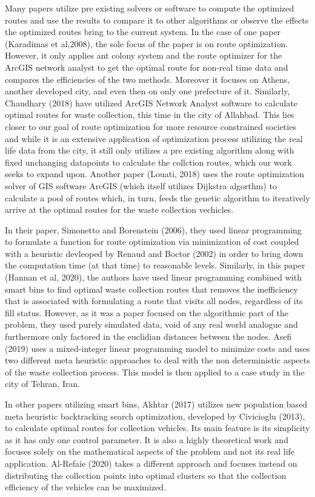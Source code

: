 \documentclass[12pt]{article}
\begin{document}
Many papers utilize pre existing solvers or software to compute the optimized routes and use the results to compare it to other algorithms or observe the effects the optimized routes bring to the current system. In the case of one paper (Karadimas et al,2008), the sole focus of the paper is on route optimization. However, it only applies ant colony system and the route optimizer for the ArcGIS network analyst to get the optimal route for non-real time data and compares the efficiencies of the two methods. Moreover it focuses on Athens, another developed city, and even then on only one prefecture of it. Similarly, Chaudhary (2018) have utilized ArcGIS Network Analyst software to calculate optimal routes for waste collection, this time in the city of Allahbad. This lies closer to our goal of route optimization for more resource constrained societies and while it is an extensive application of optimization process utilizing the real life data from the city, it still only utilizes a pre existing algorithm along with fixed unchanging datapoints to calculate the collction routes, which our work seeks to expand upon. Another paper (Louati, 2018) uses the route optimization solver of GIS software ArcGIS (which itself utilizes Dijkstra algorthm) to calculate a pool of routes which, in turn, feeds the genetic algorithm to iteratively arrive at the optimal routes for the waste collection vechicles.

In their paper, Simonetto and Borenstein (2006), they used linear programming to formulate a function for route optimization via minimization of cost coupled with a heuristic devleoped by Renaud and Boctor (2002) in order to bring down the computation time (at that time) to reasonable levels. Similarly, in this paper (Hannan et al, 2020), the authors have used linear programming combined with smart bins to find optimal waste collection routes that removes the inefficiency that is associated with formulating a route that visits all nodes, regardless of its fill status. However, as it was a paper focused on the algorithmic part of the problem, they used purely simulated data, void of any real world analogue and furthermore only factored in the euclidian distances between the nodes. Asefi (2019) uses a mixed-integer linear programming model to minimize costs and uses two different meta heuristic approaches to deal with the non deterministic aspects of the waste collection process. This model is then applied to a case study in the city of Tehran, Iran. 

In other papers utilizing smart bins, Akhtar (2017) utilizes new population based meta heuristic backtracking search optimization, developed by Civicioglu (2013), to calculate optimal routes for collection vehicles. Its main feature is its simplicity as it has only one control parameter. It is also a highly theoretical work and focuses solely on the mathematical aspects of the problem and not its real life application. Al-Refaie (2020) takes a different approach and focuses instead on distributing the collection points into optimal clusters so that the collection efficiency of the vehicles can be maximized. 
\end{document}
